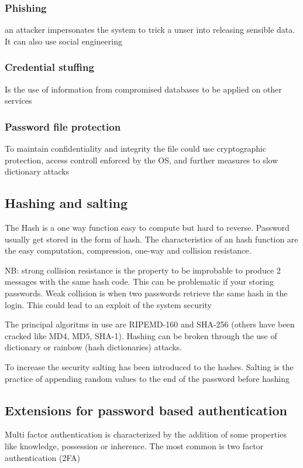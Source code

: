 \documentclass[12pt, a4paper]{article}
\begin{document}
\subsubsection*{Phishing}
an attacker impersonates the system to trick a unser into releasing sensible data. It can also use social engineering 

\subsubsection*{Credential stuffing}
Is the use of information from compromised databases to be applied on other services

\subsubsection*{Password file protection}
To maintain confidentiality and integrity the file could use cryptographic protection, access controll enforced by the OS,
and further measures to slow dictionary attacks

\subsection{Hashing and salting}
The Hash is a one way function easy to compute but hard to reverse. Password usually get stored in the form of hash.
The characteristics of an hash function are the easy computation, compression, one-way and collision resistance.

NB: strong collision resistance is the property to be improbable to produce 2 messages with the same hash code. This can 
be problematic if your storing passwords. Weak collision is when two passwords retrieve the same hash in the login. This 
could lead to an exploit of the system security

The principal algoritms in use are RIPEMD-160 and SHA-256 (others have been cracked like MD4, MD5, SHA-1). 
Hashing can be broken through the use of dictionary or rainbow (hash dictionaries) attacks.

To increase the security salting has been introduced to the hashes. Salting is the practice of appending random values
to the end of the password before hashing

\subsection{Extensions for password based authentication}
Multi factor authentication is characterized by the addition of some properties like knowledge, possession or inherence.
The most common is two factor authentication (2FA) 
\end{document}
